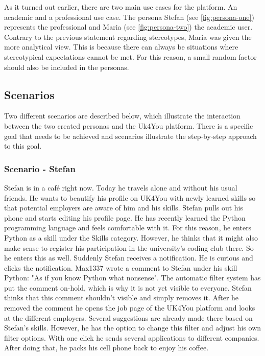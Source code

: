 As it turned out earlier, there are two main use cases for the platform.
An academic and a professional use case.
The persona Stefan (see \autoref{fig:persona-one}) represents the professional and Maria (see \autoref{fig:persona-two}) the academic user.
Contrary to the previous statement regarding stereotypes, Maria was given the more analytical view.
This is because there can always be situations where stereotypical expectations cannot be met.
For this reason, a small random factor should also be included in the personas.

\subsection{Scenarios}
Two different scenarios are described below, which illustrate the interaction between the two created personas and the Uk4You platform.
There is a specific goal that needs to be achieved and scenarios illustrate the step-by-step approach to this goal.

\subsubsection{Scenario - Stefan}
Stefan is in a café right now.
Today he travels alone and without his usual friends.
He wants to beautify his profile on UK4You with newly learned skills so that potential employers are aware of him and his skills.
Stefan pulls out his phone and starts editing his profile page.
He has recently learned the Python programming language and feels comfortable with it.
For this reason, he enters Python as a skill under the Skills category.
However, he thinks that it might also make sense to register his participation in the university's coding club there.
So he enters this as well.
Suddenly Stefan receives a notification.
He is curious and clicks the notification.
Max1337 wrote a comment to Stefan under his skill Python: "As if you know Python what nonsense".
The automatic filter system has put the comment on-hold, which is why it is not yet visible to everyone.
Stefan thinks that this comment shouldn't visible and simply removes it.
After he removed the comment he opens the job page of the UK4You platform and looks at the different employers.
Several suggestions are already made there based on Stefan's skills.
However, he has the option to change this filter and adjust his own filter options.
With one click he sends several applications to different companies.
After doing that, he packs his cell phone back to enjoy his coffee.

